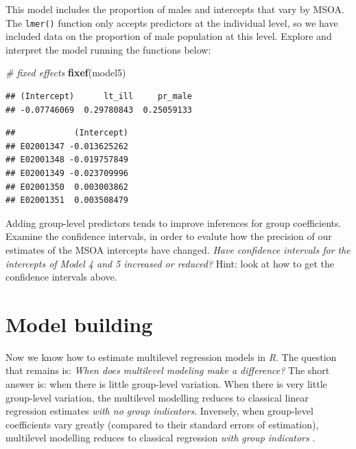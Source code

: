 \documentclass[]{book}
\newenvironment{Shaded}{\begin{snugshade}}{\end{snugshade}}
\newcommand{\KeywordTok}[1]{\textcolor[rgb]{0.13,0.29,0.53}{\textbf{#1}}}
\newcommand{\DecValTok}[1]{\textcolor[rgb]{0.00,0.00,0.81}{#1}}
\newcommand{\StringTok}[1]{\textcolor[rgb]{0.31,0.60,0.02}{#1}}
\newcommand{\CommentTok}[1]{\textcolor[rgb]{0.56,0.35,0.01}{\textit{#1}}}
\newcommand{\OperatorTok}[1]{\textcolor[rgb]{0.81,0.36,0.00}{\textbf{#1}}}
\newcommand{\NormalTok}[1]{#1}
\begin{document}
This model includes the proportion of males and intercepts that vary by
MSOA. The \texttt{lmer()} function only accepts predictors at the
individual level, so we have included data on the proportion of male
population at this level. Explore and interpret the model running the
functions below:

\begin{Shaded}
\begin{Highlighting}[]
\CommentTok{# fixed effects}
\KeywordTok{fixef}\NormalTok{(model5)}
\end{Highlighting}
\end{Shaded}

\begin{verbatim}
## (Intercept)      lt_ill     pr_male 
## -0.07746069  0.29780843  0.25059133
\end{verbatim}

\begin{Shaded}
\end{Shaded}

\begin{verbatim}
##            (Intercept)
## E02001347 -0.013625262
## E02001348 -0.019757849
## E02001349 -0.023709996
## E02001350  0.003003862
## E02001351  0.003508479
\end{verbatim}

Adding group-level predictors tends to improve inferences for group
coefficients. Examine the confidence intervals, in order to evalute how
the precision of our estimates of the MSOA intercepts have changed.
\emph{Have confidence intervals for the intercepts of Model 4 and 5
increased or reduced?} Hint: look at how to get the confidence intervals
above.

\section{Model building}\label{model-building}

Now we know how to estimate multilevel regression models in \emph{R}.
The question that remains is: \emph{When does multilevel modeling make a
difference?} The short answer is: when there is little group-level
variation. When there is very little group-level variation, the
multilevel modelling reduces to classical linear regression estimates
\emph{with no group indicators}. Inversely, when group-level
coefficients vary greatly (compared to their standard errors of
estimation), multilevel modelling reduces to classical regression
\emph{with group indicators} \citet{Gelman_Hill_2006_book}.
\end{document}
